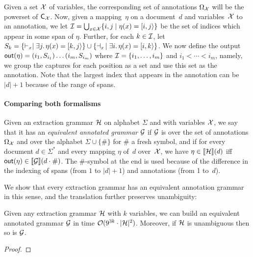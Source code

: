 \begin{definition}
  \label{gram:def:outputset}
Given a set $\mathcal{X}$ of variables, the corresponding set of annotations $\Omega_{\mathcal{X}}$ will be the powerset of $\textsf{C}_{\mathcal{X}}$.
Now, given a mapping~$\eta$ on a document~$d$ and variables~$\mathcal{X}$ to an annotation, we 
%
%
let $\mathcal{I} = \bigcup_{x \in \mathcal{X}} \{i, j \mid \eta(x) = [i,j\rangle\}$ be the
set of indices which appear in some span of $\eta$.
Further, for each $k \in \mathcal{I}$, let $S_k = \{\vdash_x \mid \exists j. \, \eta(x) = [k,j\rangle\} \cup \{\dashv_x \, \mid \exists i. \, \eta(x) = [i,k\rangle\}$. We now define the output $\textsf{out}(\eta) = (i_1,S_{i_1})\ldots(i_m,S_{i_m})$ where $\mathcal{I} = \{i_1,\ldots,i_m\}$ and  $i_1 < \cdots < i_m$, namely, we group the captures for each position as a set and use this set as the annotation.
Note that the largest index that appears in the annotation can be $|d|+1$ because of the range of spans.
\end{definition}


  


\paragraph{Comparing both formalisms}
Given an extraction grammar $\mathcal{H}$ on alphabet $\Sigma$ and with variables
$\mathcal{X}$, we say that it 
has an \emph{equivalent annotated grammar} $\mathcal{G}$ if $\mathcal{G}$ is over the 
set of annotations $\Omega_{\mathcal{X}}$ and over the
alphabet $\Sigma \cup \{\#\}$
for $\#$ a fresh symbol, and
if for every document $d \in \Sigma^*$ and every mapping $\eta$ of~$d$ over~$\mathcal{X}$, we have
$\eta \in {\llbracket{\mathcal{H}}\rrbracket}(d)$ iff $\textsf{out}(\eta) \in {\llbracket{\mathcal{G}}\rrbracket}(d\cdot \#)$.
%
The $\#$-symbol at the end is used because of the difference in the indexing of spans (from $1$ to $|d|+1$) and annotations (from 1 to~$d$).
%

We show that every extraction grammar has an equivalent annotation grammar
in this sense, and the translation further preserves unambiguity:

%

\begin{proposition}\label{gram:prop:extrac-grammars-general}
  Given any extraction grammar $\mathcal{H}$ with $k$ variables, we can build an
  equivalent annotated grammar $\mathcal{G}$ in time $\mathcal{O}(9^{3k}\cdot|\mathcal{H}|^2)$. Moreover, if $\mathcal{H}$ is unambiguous then so is $\mathcal{G}$.
\end{proposition}
\begin{proof}
  
\end{proof}

